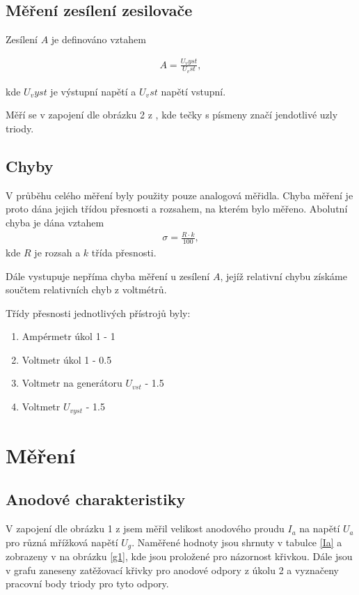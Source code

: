 \documentclass[a4paper,12pt]{article}
\begin{document}
\subsection{Měření zesílení zesilovače}
Zesílení $A$ je definováno vztahem

\begin{eqnarray}
A = \frac{U_vyst}{U_vst},
\label{A}
\end{eqnarray}

kde $U_vyst$ je výstupní napětí a $U_vst$ napětí vstupní.

Měří se v zapojení dle obrázku 2 z \cite{text}, kde tečky s písmeny značí jendotlivé uzly triody.

\subsection{Chyby}
V průběhu celého měření byly použity pouze analogová měřidla. Chyba měření je proto dána jejich třídou přesnosti a rozsahem, 
na kterém bylo měřeno. Abolutní chyba je dána vztahem 
\begin{eqnarray}
\sigma = \frac{R\cdot k}{100},
\end{eqnarray}
kde $R$ je rozsah a $k$ třída přesnosti.

Dále vystupuje nepříma chyba měření u zesílení $A$, jejíž relativní chybu získáme součtem relativních chyb z voltmétrů.

Třídy přesnosti jednotlivých přístrojů byly:
\begin{enumerate}
    \item Ampérmetr úkol 1 - 1
    \item Voltmetr úkol 1 - 0.5
    \item Voltmetr na generátoru $U_{vst}$ - 1.5
    \item Voltmetr $U_{vyst}$ - 1.5
\end{enumerate}


\section{Měření}

\subsection{Anodové charakteristiky}
V zapojení dle obrázku 1 z \cite{text} jsem měřil velikost anodového proudu $I_a$ na napětí $U_a$ pro různá mřížková napětí $U_g$.
Naměřené hodnoty jsou shrnuty v tabulce \ref{Ia} a zobrazeny v na obrázku \ref{g1}, kde jsou proložené pro názornost křivkou. Dále 
jsou v grafu zaneseny zatěžovací křivky pro anodové odpory z úkolu 2 a vyznačeny pracovní body triody pro tyto odpory.
\end{document}
